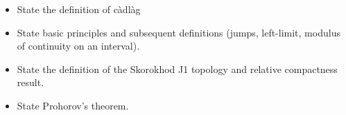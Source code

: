 \begin{itemize}[label=$\circ$]
  \item
    State the definition of c\`adl\`ag
  \item
    State basic principles and subsequent definitions (jumps, left-limit, modulus of continuity on an interval).
  \item
    State the definition of the Skorokhod J1 topology and relative compactness result.
  \item
    State Prohorov's theorem.
\end{itemize}
